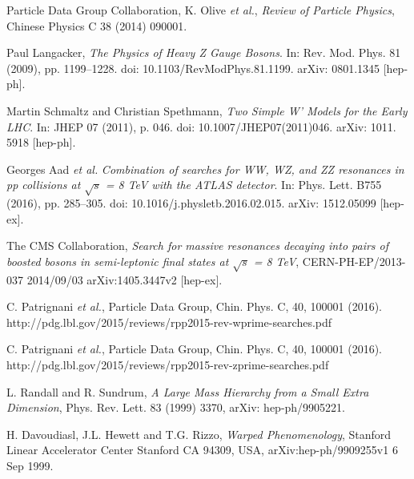 \documentclass[UKenglish,texlive=2013]{\ATLASLATEXPATH atlasdoc}
\newcommand{\cme}{\sqrt{s}}
\begin{document}




\begin{thebibliography}{9}

  Particle Data Group Collaboration, K. Olive \emph{et al.},
  \emph{ Review of Particle Physics},
Chinese Physics C 38 (2014) 090001.

Paul Langacker,
\emph{The Physics of Heavy
Z Gauge Bosons}. In: Rev. Mod. Phys.
81 (2009), pp. 1199–1228. doi: 10.1103/RevModPhys.81.1199. arXiv: 0801.1345
[hep-ph].

Martin Schmaltz and Christian Spethmann,
\emph{Two Simple W’ Models for the Early
LHC}. In: JHEP 07 (2011), p. 046. doi: 10.1007/JHEP07(2011)046. arXiv: 1011.
5918 [hep-ph].

Georges Aad \emph{et al.}
\emph{Combination of searches for WW, WZ, and ZZ resonances
in pp collisions at $\sqrt{s}$ = 8 TeV with the ATLAS detector}. In: Phys. Lett. B755
(2016), pp. 285–305. doi: 10.1016/j.physletb.2016.02.015. arXiv: 1512.05099
[hep-ex].

The CMS Collaboration,
\emph{Search for massive resonances decaying into pairs of boosted bosons in semi-leptonic final states at $\cme$ = 8 TeV},
CERN-PH-EP/2013-037
2014/09/03
arXiv:1405.3447v2 [hep-ex].

C. Patrignani \emph{et al.},
Particle Data Group, Chin. Phys. C, 40, 100001 (2016).
http://pdg.lbl.gov/2015/reviews/rpp2015-rev-wprime-searches.pdf

C. Patrignani \emph{et al.},
Particle Data Group, Chin. Phys. C, 40, 100001 (2016).
http://pdg.lbl.gov/2015/reviews/rpp2015-rev-zprime-searches.pdf

L. Randall and R. Sundrum,
\emph{A Large Mass Hierarchy from a Small Extra Dimension},
Phys. Rev. Lett. 83 (1999) 3370, arXiv: hep-ph/9905221.

H. Davoudiasl, J.L. Hewett and T.G. Rizzo,
\emph{Warped Phenomenology},
Stanford Linear Accelerator Center
Stanford CA 94309, USA,
arXiv:hep-ph/9909255v1 6 Sep 1999.


\end{thebibliography}
\end{document}
